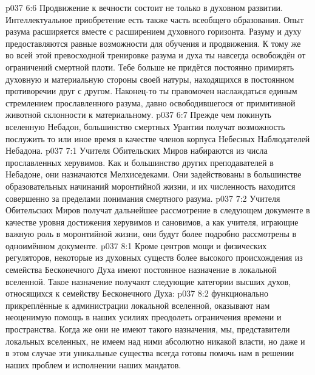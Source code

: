 \vs p037 6:6 Продвижение к вечности состоит не только в духовном развитии. Интеллектуальное приобретение есть также часть всеобщего образования. Опыт разума расширяется вместе с расширением духовного горизонта. Разуму и духу предоставляются равные возможности для обучения и продвижения. К тому же во всей этой превосходной тренировке разума и духа ты навсегда освобождён от ограничений смертной плоти. Тебе больше не придётся постоянно примирять духовную и материальную стороны своей натуры, находящихся в постоянном противоречии друг с другом. Наконец\hyp{}то ты правомочен наслаждаться единым стремлением прославленного разума, давно освободившегося от примитивной животной склонности к материальному.
\vs p037 6:7 \pc Прежде чем покинуть вселенную Небадон, большинство смертных Урантии получат возможность послужить то или иное время в качестве членов корпуса Небесных Наблюдателей Небадона.
\vs p037 7:1 Учителя Обительских Миров набираются из числа прославленных херувимов. Как и большинство других преподавателей в Небадоне, они назначаются Мелхиседеками. Они задействованы в большинстве образовательных начинаний моронтийной жизни, и их численность находится совершенно за пределами понимания смертного разума.
\vs p037 7:2 Учителя Обительских Миров получат дальнейшее рассмотрение в следующем документе в качестве уровня достижения херувимов и сановимов, а как учителя, играющие важную роль в моронтийной жизни, они будут более подробно рассмотрены в одноимённом документе.
\vs p037 8:1 Кроме центров мощи и физических регуляторов, некоторые из духовных существ более высокого происхождения из семейства Бесконечного Духа имеют постоянное назначение в локальной вселенной. Такое назначение получают следующие категории высших духов, относящихся к семейству Бесконечного Духа:
\vs p037 8:2 \pc {} функционально прикреплённые к администрации локальной вселенной, оказывают нам неоценимую помощь в наших усилиях преодолеть ограничения времени и пространства. Когда же они не имеют такого назначения, мы, представители локальных вселенных, не имеем над ними абсолютно никакой власти, но даже и в этом случае эти уникальные существа всегда готовы помочь нам в решении наших проблем и исполнении наших мандатов.
